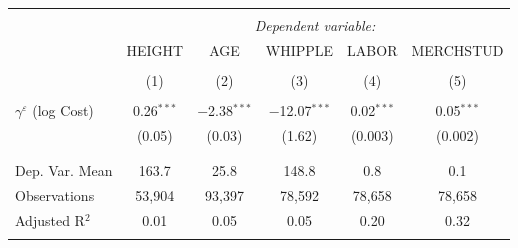 
\begin{tabular}{@{\extracolsep{5pt}}lccccc} 
\\[-1.8ex]\hline 
\hline \\[-1.8ex] 
 & \multicolumn{5}{c}{\textit{Dependent variable:}} \\ 
\cline{2-6} 
 & HEIGHT & AGE & WHIPPLE & LABOR & MERCHSTUD \\ 
\\[-1.8ex] & (1) & (2) & (3) & (4) & (5)\\ 
\hline \\[-1.8ex] 
 $\gamma^{\varepsilon}$ (log Cost) & 0.26$^{***}$ & $-$2.38$^{***}$ & $-$12.07$^{***}$ & 0.02$^{***}$ & 0.05$^{***}$ \\ 
  & (0.05) & (0.03) & (1.62) & (0.003) & (0.002) \\ 
  & & & & & \\ 
\hline \\[-1.8ex] 
Dep. Var. Mean & 163.7 & 25.8 & 148.8 & 0.8 & 0.1 \\ 
Observations & 53,904 & 93,397 & 78,592 & 78,658 & 78,658 \\ 
Adjusted R$^{2}$ & 0.01 & 0.05 & 0.05 & 0.20 & 0.32 \\ 
\hline 
\hline \\[-1.8ex] 
\end{tabular} 
